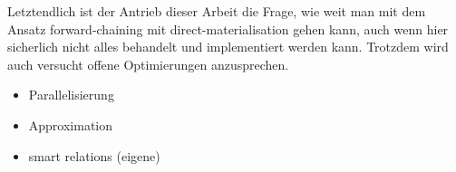 Letztendlich ist der Antrieb dieser Arbeit die Frage, wie weit man mit dem Ansatz forward-chaining mit direct-materialisation gehen kann, auch wenn hier sicherlich nicht alles behandelt und implementiert werden kann. Trotzdem wird auch versucht offene Optimierungen anzusprechen.

\begin{itemize}
  \item Parallelisierung
  \item Approximation
  \item smart relations (eigene)
\end{itemize}

